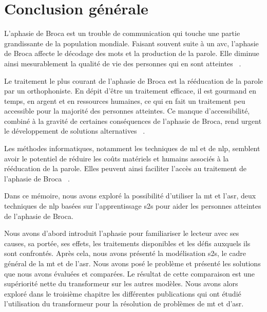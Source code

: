 \chapter*{Conclusion générale}
\label{chap.general-conclusion}

L'aphasie de Broca est un trouble de communication qui touche une partie grandissante de la population mondiale.
Faisant souvent suite à un \gls{avc}, l'aphasie de Broca affecte le décodage des mots et la production de la parole.
Elle diminue ainsi mesurablement la qualité de vie des personnes qui en sont atteintes%
~\cite{Feigin_Brainin_Norrving_Martins_Sacco_Hacke_Fisher_Pandian_Lindsay_2022,Chapey_2008,Ross_Wertz_2010}.

Le traitement le plus courant de l'aphasie de Broca est la rééducation de la parole par un orthophoniste.
En dépit d'être un traitement efficace, il est gourmand en temps, en argent et en ressources humaines,
ce qui en fait un traitement peu accessible pour la majorité des personnes atteintes.
Ce manque d'accessibilité, combiné à la gravité de certaines conséquences de l'aphasie de Broca,
rend urgent le développement de solutions alternatives%
~\cite{recover,Flowers_Skoretz_Silver_Rochon_Fang_Flamand-Roze_Martino_2016}.

Les méthodes informatiques, notamment les techniques de \gls{ml} et de \gls{nlp},
semblent avoir le potentiel de réduire les coûts matériels et humains associés à la rééducation de la parole.
Elles peuvent ainsi faciliter l'accès au traitement de l'aphasie de Broca%
~\cite{Smaili_Langlois_Pribil_2022,Qin_Lee_Kong_Lin_2022,Misra_Mishra_Gandhi_2022}.

Dans ce mémoire, nous avons exploré la possibilité d'utiliser la \gls{mt} et l'\gls{asr},
deux techniques de \gls{nlp} basées sur l'apprentissage \gls{s2s} 
pour aider les personnes atteintes de l'aphasie de Broca.

Nous avons d'abord introduit l'aphasie pour familiariser le lecteur avec
ses causes, sa portée, ses effets, les traitements disponibles et les défis auxquels ils sont confrontés.
Après cela, nous avons présenté la modélisation \gls{s2s}, le cadre général de la \gls{mt} et de l'\gls{asr}.
Nous avons posé le problème et présenté les solutions que nous avons évaluées et comparées.
Le résultat de cette comparaison est une supériorité nette du transformeur sur les autres modèles.
Nous avons alors exploré dans le troisième chapitre les différentes publications qui ont étudié
l'utilisation du transformeur pour la résolution de problèmes de \gls{mt} et d'\gls{asr}.


